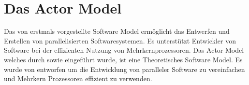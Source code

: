 \chapter{Das Actor Model}
Das von \cite{hewitt1973session} erstmals vorgestellte Software Model ermöglicht das Entwerfen und Erstellen von parallelisierten Softwaresystemen. Es unterstützt Entwickler von Software bei der effizienten Nutzung von Mehrkernprozessoren.
Das Actor Model welches durch \cite{hewitt1973session} sowie \cite{Agha1985ActorsSystems} eingeführt wurde, ist eine Theoretisches Software Model. 
Es wurde von \cite{hewitt1973session} entworfen um die Entwicklung von paralleler Software zu vereinfachen und Mehrkern Prozessoren effizient zu verwenden.